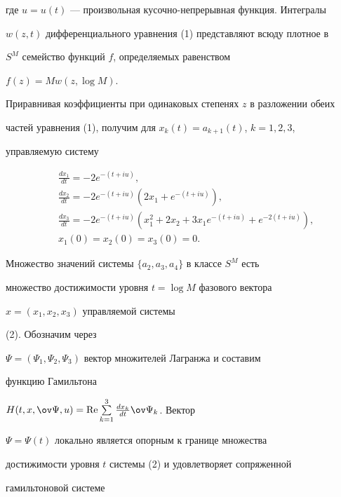 где $u=u(t)$ --- произвольная кусочно-непрерывная функция. Интегралы


$w(z,t)$ дифференциального уравнения (1) представляют всюду плотное в


$S^M$ семейство функций $f$, определяемых равенством


$f(z)=Mw(z,\log M)$.





Приравнивая коэффициенты при одинаковых степенях $z$ в разложении обеих


частей уравнения (1), получим для $x_k(t)=a_{k+1}(t)$, $k=1,2,3$,


управляемую систему


\begin{equation}


\begin{split}


&\frac{dx_1}{dt}=-2e^{-(t+iu)}, \\


&\frac{dx_2}{dt}=-2e^{-(t+iu)}(2x_1+e^{-(t+iu)}),\\


&\frac{dx_3}{dt}=-2e^{-(t+iu)}(x^2_1+2x_2+3x_1e^{-(t+iu)}+e^{-2(t+iu)}),\\


&x_1(0)=x_2(0)=x_3(0)=0.


\end{split}


\end{equation}





Множество значений системы $\{a_2,a_3,a_4\}$ в классе $S^M$ есть


множество достижимости уровня $t=\log M$ фазового вектора


$x=(x_1,x_2,x_3)$ управляемой системы


(2). Обозначим через


$\Psi=(\Psi_1,\Psi_2,\Psi_3)$ вектор множителей Лагранжа и составим


функцию Гамильтона


$H(t,x,\ov\Psi,u)=\re\sum\limits^3_{k=1}\frac{dx_k}{dt}\ov\Psi_k$. Вектор


$\Psi=\Psi(t)$ локально является опорным к границе множества


достижимости уровня $t$ системы (2) и удовлетворяет сопряженной


гамильтоновой системе


